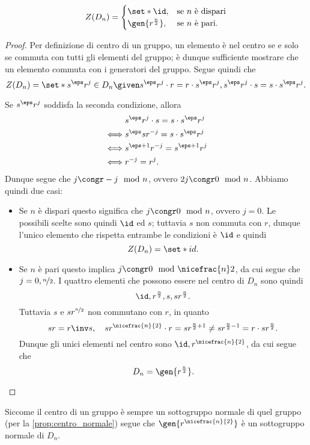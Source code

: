 \begin{proposition}
    \[
        Z(D_n) = \begin{cases}
            \set*{\id}, &\text{se } n \text{ è dispari}\\
            \gen{r^{\frac{n}2}}, &\text{se $n$ è pari}.
        \end{cases}   
    \]
\end{proposition}
\begin{proof}
    Per definizione di centro di un gruppo, un elemento è nel centro se e solo se commuta con tutti gli elementi del gruppo; è dunque sufficiente mostrare che un elemento commuta con i generatori del gruppo. Segue quindi che \[
        Z(D_n) = \set*{s^\eps r^j \in D_n \given s^\eps r^j \cdot r = r \cdot s^\eps r^j, s^\eps r^j \cdot s = s \cdot s^\eps r^j}.
    \]

    Se $s^\eps r^j$ soddisfa la seconda condizione, allora \begin{align*}
        &s^\eps r^j \cdot s = s \cdot s^\eps r^j \\
        \iff &s^\eps sr^{-j} = s \cdot s^\eps r^j  \\
        \iff &s^{\eps + 1}r^{-j} = s^{\eps + 1} r^j\\
        \iff &r^{-j} = r^j.
    \end{align*} Dunque segue che $j \congr -j \mod{n}$, ovvero $2j \congr 0 \mod{n}$. Abbiamo quindi due casi:
    \begin{itemize}
        \item Se $n$ è dispari questo significa che $j \congr 0 \mod{n}$, ovvero $j = 0$. 
        Le possibili scelte sono quindi $\id$ ed $s$; tuttavia $s$ non commuta con $r$, dunque l'unico elemento che rispetta entrambe le condizioni è $\id$ e quindi \[
            Z(D_n) = \set*{id}.    
        \]
        \item Se $n$ è pari questo implica $j \congr 0 \mod{\nicefrac{n}2}$, da cui segue che $j = 0, \nicefrac{n}2$. I quattro elementi che possono essere nel centro di $D_n$ sono quindi \[
            \id, r^{\frac{n}2}, s, sr^\frac{n}{2}.   
        \] Tuttavia $s$ e $sr^{\nicefrac{n}{2}}$ non commutano con $r$, in quanto \[
            sr = r\inv s, \quad sr^{\nicefrac{n}{2}} \cdot r = sr^{\frac{n}{2} + 1} \neq sr^{\frac{n}{2} - 1} = r \cdot sr^\frac{n}{2}.
    \]  Dunque gli unici elementi nel centro sono $\id, r^{\nicefrac{n}{2}}$, da cui segue che \[
        D_n = \gen{r^\frac{n}{2}}. \qedhere    
    \]
    \end{itemize}
\end{proof}

Siccome il centro di un gruppo è sempre un sottogruppo normale di quel gruppo (per la \autoref{prop:centro_normale}) segue che $\gen{r^{\nicefrac{n}{2}}}$ è un sottogruppo normale di $D_n$.